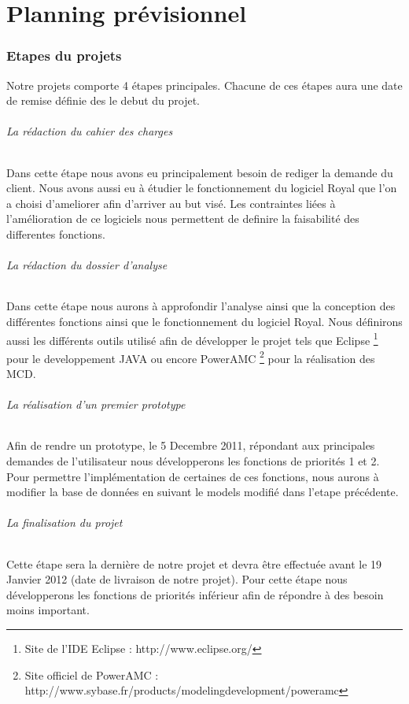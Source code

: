 \part{Planning prévisionnel}

\section{Etapes du projets}

Notre projets comporte 4 étapes principales. Chacune de ces étapes aura une date de remise définie des le debut du projet. 

\paragraph{La rédaction du cahier des charges}
Dans cette étape nous avons eu principalement besoin de rediger la demande du client. 
Nous avons aussi eu à étudier le fonctionnement du logiciel Royal que l'on a choisi d'ameliorer afin d'arriver au but visé.
Les contraintes liées à l'amélioration de ce logiciels nous permettent de definire la faisabilité des differentes fonctions. 

\paragraph{La rédaction du dossier d'analyse}
Dans cette étape nous aurons à approfondir l'analyse ainsi que la conception des différentes fonctions ainsi que le fonctionnement du logiciel Royal. 
Nous définirons aussi les différents outils utilisé afin de développer le projet tels que 
Eclipse \footnote{Site de l'IDE Eclipse : http://www.eclipse.org/} 
pour le developpement JAVA ou encore 
PowerAMC \footnote{Site officiel de PowerAMC : http://www.sybase.fr/products/modelingdevelopment/poweramc}
pour la réalisation des MCD.

\paragraph{La réalisation d'un premier prototype}
Afin de rendre un prototype, le 5 Decembre 2011, répondant aux principales demandes de l'utilisateur nous développerons les fonctions de priorités 1 et 2.
Pour permettre l'implémentation de certaines de ces fonctions, nous aurons à modifier la base de données en suivant le models modifié dans l'etape précédente.  

\paragraph{La finalisation du projet}
Cette étape sera la dernière de notre projet et devra être effectuée avant le 19 Janvier 2012 (date de livraison de notre projet).
Pour cette étape nous développerons les fonctions de priorités inférieur afin de répondre à des besoin moins important. 

